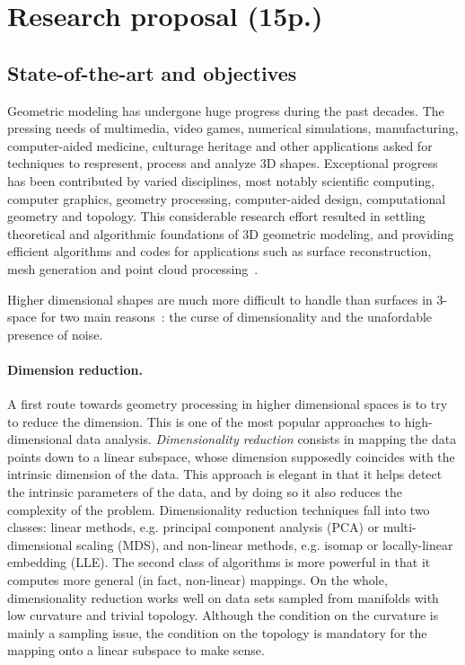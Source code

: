 \section{Research proposal (15p.)}

\subsection{State-of-the-art and objectives}

Geometric modeling has undergone huge progress during the past decades. The pressing needs
of multimedia, video games, numerical simulations, manufacturing, computer-aided medicine, culturage heritage and other applications asked for techniques to respresent, process and analyze
3D shapes.  Exceptional progress has been contributed by  varied disciplines, most notably scientific computing, computer graphics, geometry processing, computer-aided design, computational geometry and topology. This considerable research effort resulted in settling theoretical and algorithmic foundations of 3D geometric modeling, and providing efficient algorithms and codes for applications such as surface reconstruction, mesh generation and point cloud processing~\cite{geometrica-bcmrv-ms-06,dey-csr-2007}.  

Higher dimensional shapes are much more difficult to handle than surfaces in 3-space for two main reasons~: the curse of dimensionality and the unafordable presence of noise.


\paragraph{Dimension reduction.} A first route towards geometry processing in higher dimensional spaces is to try to reduce the dimension. This is 
one of the most popular approaches to high-dimensional data analysis. {\em Dimensionality reduction} consists in mapping the data points down to a linear subspace, whose dimension supposedly coincides with the intrinsic dimension of the data. This approach is elegant in that it helps detect the intrinsic parameters of the data, and by doing so it also reduces the complexity of the problem. Dimensionality reduction techniques fall into two classes: linear methods, e.g. principal component analysis (PCA) or multi-dimensional scaling (MDS), and non-linear methods, e.g. isomap or locally-linear embedding (LLE). The second class of algorithms is more powerful in that it computes more general (in fact, non-linear) mappings. On the whole, dimensionality reduction works well on data sets sampled from manifolds with low curvature and trivial topology. Although the condition on the curvature is mainly a sampling issue, the condition on the topology is mandatory for the mapping onto a linear subspace to make sense. 

